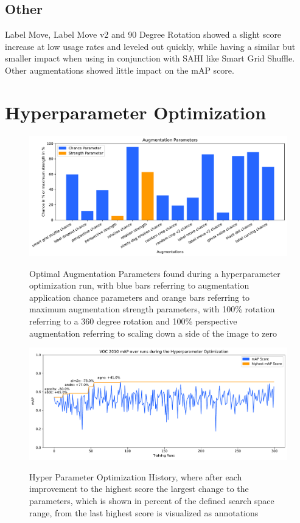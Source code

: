 \documentclass[10pt]{book}
\begin{document}
\subsection{Other} %

Label Move, Label Move v2 and 90 Degree Rotation showed a slight score increase at low usage rates and leveled out quickly, while having a similar but smaller impact when using in conjunction with \ac{SAHI} like Smart Grid Shuffle. Other augmentations showed little impact on the \ac{mAP} score.

\section{Hyperparameter Optimization}

\begin{figure}
  \caption{Optimal Augmentation Parameters found during a hyperparameter optimization run, with blue bars referring to augmentation application chance parameters and orange bars referring to maximum augmentation strength parameters, with 100\% rotation referring to a 360 degree rotation and 100\% perspective augmentation referring to scaling down a side of the image to zero}
  \includegraphics[width=\textwidth]{plot/best_hyp_run_params}
  \label{fig:optimal_augment_params} 
\end{figure} %

\begin{figure}
  \caption{Hyper Parameter Optimization History, where after each improvement to the highest score the largest change to the parameters, which is shown in percent of the defined search space range, from the last highest score is visualized as annotations}
  \includegraphics[width=\textwidth]{image/hyp-param-search-yolov5s-sahi-rc-fix-history}
  \label{fig:hyp_hist}
\end{figure}
\end{document}
